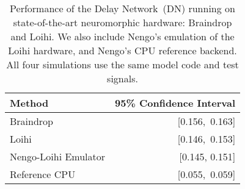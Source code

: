 \begin{table}
\centering
  \begin{tabular}{@{}lr@{}} \toprule
    Method & 95\% Confidence Interval \\
    \midrule
Braindrop & [0.156,~0.163] \\
Loihi & [0.146,~0.153] \\
Nengo-Loihi Emulator & [0.145, 0.151] \\
Reference CPU & [0.055,~0.059] \\
    \bottomrule
  \end{tabular}
  \caption[Delay Network benchmark on neuromorphic hardware.]{ \label{tab:dn-neuromorphic}
      Performance of the Delay Network~(DN) running on state-of-the-art neuromorphic hardware:
      Braindrop and Loihi.
      We also include Nengo's emulation of the Loihi hardware, and Nengo's CPU reference backend.
      All four simulations use the same model code and test signals.
  }
\end{table}

